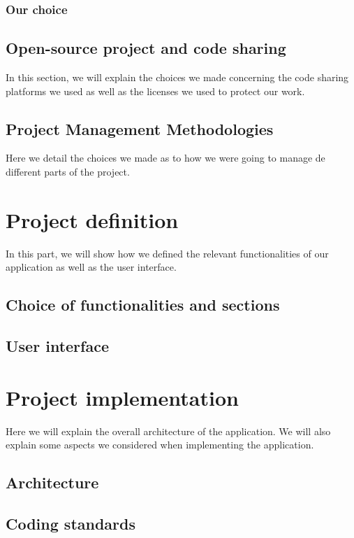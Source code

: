 \documentclass[12pt]{article} %
\begin{document}
\subsubsection{Our choice}

\subsection{Open-source project and code sharing}

In this section, we will explain the choices we made concerning the code sharing platforms we used as well as the licenses we used to protect our work.

\subsection{Project Management Methodologies}

Here we detail the choices we made as to how we were going to manage de different parts of the project.

\section{Project definition}

In this part, we will show how we defined the relevant functionalities of our application as well as the user interface.

\subsection{Choice of functionalities and sections}

\subsection{User interface}

\section{Project implementation}

Here we will explain the overall architecture of the application. We will also explain some aspects we considered when implementing the application.

\subsection{Architecture}

\subsection{Coding standards}
\end{document}
